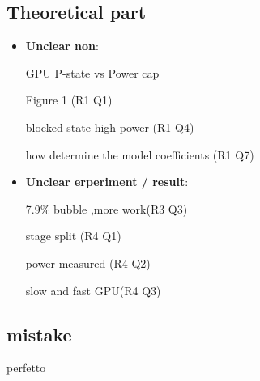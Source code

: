 \subsection{Theoretical part}

\begin{itemize}
\item \textbf{Unclear non}:

GPU P-state vs Power cap

Figure 1 (R1 Q1)

blocked state high power (R1 Q4)

how determine the model coefficients (R1 Q7)


\item \textbf{Unclear erperiment / result}:

7.9\% bubble ,more work(R3 Q3)

stage split (R4 Q1)

power measured (R4 Q2)

slow and fast GPU(R4 Q3)

\end{itemize}



\subsection{mistake}

perfetto




